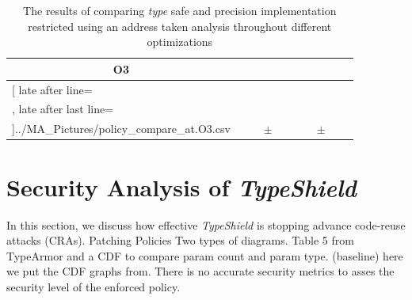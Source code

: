 \begin{table}[!htbp]
{\begin{tabular}{l|c|rcl|c|rcl|c}
\multicolumn{1}{c}{\bfseries O3}
	\\\midrule
	\csvreader[ late after line=\\, late after last line=\\\bottomrule]{../MA_Pictures/policy_compare_at.O3.csv}{
}
	{\csvcolii  &  \csvcoliii & \csvcolxiii & $\pm$ & \csvcolxiv & \csvcolxv & \csvcolxvi & $\pm$ & \csvcolxvii& \csvcolxviii}%

    	\end{tabular}
}
		\caption {The results of comparing \textit{type} safe and precision implementation restricted using an address taken analysis throughout different optimizations}
		\label{tbl:policycompattype}
\end{table}


\newpage
\section{Security Analysis of \textit{TypeShield}}
\label{section:typeshieldsecurityanalysis}

In this section, we discuss how effective \textit{TypeShield} is 
stopping advance code-reuse attacks (CRAs).
Patching Policies
Two types of diagrams. Table 5 from TypeArmor and a CDF to compare param count and param type. (baseline)
here we put the CDF graphs from. There is no accurate security metrics to asses the security level of the enforced policy.



